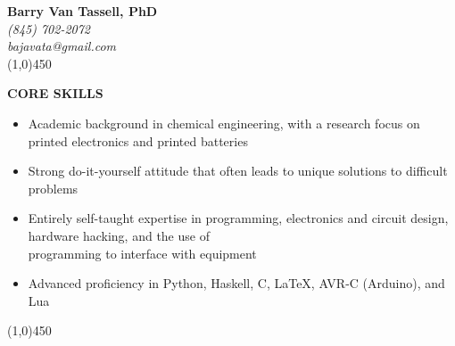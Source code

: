 \documentclass[9pt,letterpaper]{article}
\begin{document}
\begin{center}
  {\LARGE \textbf{Barry Van Tassell, PhD}}\\
  \emph{\small (845) 702-2072\\
    bajavata@gmail.com}\\
  \line(1,0){450}
\end{center}

\onehalfspacing


{\singlespacing
\noindent \textbf{CORE SKILLS}

{\small\begin{itemize}
\item Academic background in chemical engineering, with a research focus on printed electronics and printed batteries
\item Strong do-it-yourself attitude that often leads to unique solutions to difficult problems
\item Entirely self-taught expertise in programming, electronics and circuit design, hardware hacking, and the use of \\programming to interface with equipment
\item Advanced proficiency in Python, Haskell, C, \LaTeX, AVR-C (Arduino), and Lua
\end{itemize}}}

\begin{center}
  \line(1,0){450}
\end{center}
\end{document}
